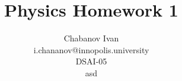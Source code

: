 \documentclass{article}
\begin{document}
\begin{titlepage}

    \begin{figure}[t]
    \end{figure}
    
    \vspace{20mm}
    \title{Physics Homework 1}
    \author{Chabanov Ivan\\i.chananov@innopolis.university\\DSAI-05\\asd}
    \maketitle

\end{titlepage}
\end{document}
